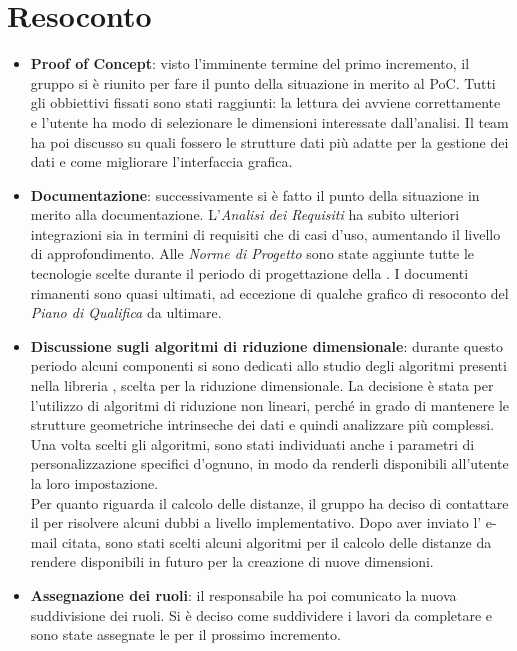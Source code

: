 \section{Resoconto}
\begin{itemize}
\item \textbf{Proof of Concept}: visto l'imminente termine del primo incremento, il gruppo si è riunito per fare il punto della situazione in merito al PoC. Tutti gli obbiettivi fissati sono stati raggiunti: la lettura dei  avviene correttamente e l'utente ha modo di selezionare le dimensioni interessate dall'analisi. Il team ha poi discusso su quali fossero le strutture dati più adatte per la gestione dei dati e come migliorare l'interfaccia grafica. 

\item\textbf{Documentazione}: successivamente si è fatto il punto della situazione in merito alla documentazione. L'\textit{Analisi dei Requisiti} ha subito ulteriori integrazioni sia in termini di requisiti che di casi d'uso, aumentando il livello di approfondimento. Alle \textit{Norme di Progetto} sono state aggiunte tutte le tecnologie scelte durante il periodo di progettazione della . I documenti rimanenti sono quasi ultimati, ad eccezione di qualche grafico di resoconto del \textit{Piano di Qualifica} da ultimare.

\item\textbf{Discussione sugli algoritmi di riduzione dimensionale}: durante questo periodo alcuni componenti si sono dedicati allo studio degli algoritmi presenti nella libreria , scelta per la riduzione dimensionale. La decisione è stata per l'utilizzo di algoritmi di riduzione non lineari, perché in grado di mantenere le strutture geometriche intrinseche dei dati e quindi analizzare  più complessi. Una volta scelti gli algoritmi, sono stati individuati anche i parametri di personalizzazione specifici d'ognuno, in modo da renderli disponibili all'utente la loro impostazione.\\ Per quanto riguarda il calcolo delle distanze, il gruppo ha deciso di contattare il  per risolvere alcuni dubbi a livello implementativo. Dopo aver inviato l' e-mail citata, sono stati scelti alcuni algoritmi per il calcolo delle distanze da rendere disponibili in futuro per la creazione di nuove dimensioni.

\item \textbf{Assegnazione dei ruoli}: il responsabile ha poi comunicato la nuova suddivisione dei ruoli. Si è deciso come suddividere i lavori da completare e sono state assegnate le  per il prossimo incremento.
\end{itemize}

\newpage